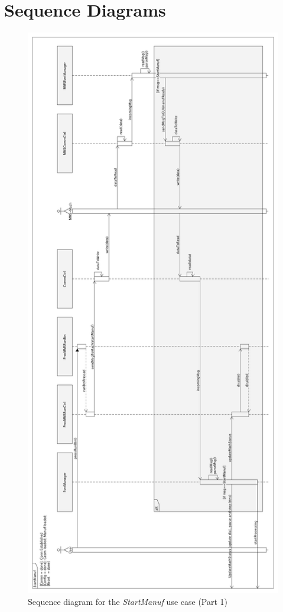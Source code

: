 \setcounter{table}{0}
\setcounter{figure}{0}
%
\chapter{Sequence Diagrams}
\label{ch:append-seq-diag}
\begin{figure}
  \begin{center}
    \includegraphics[height=1.0\textheight]{./img/seq-start-manuf-lscape.png}
  \end{center}
  \caption{Sequence diagram for the \emph{StartManuf} use case (Part 1)}\label{fig:seq-start-manuf-lscape}
\end{figure}

